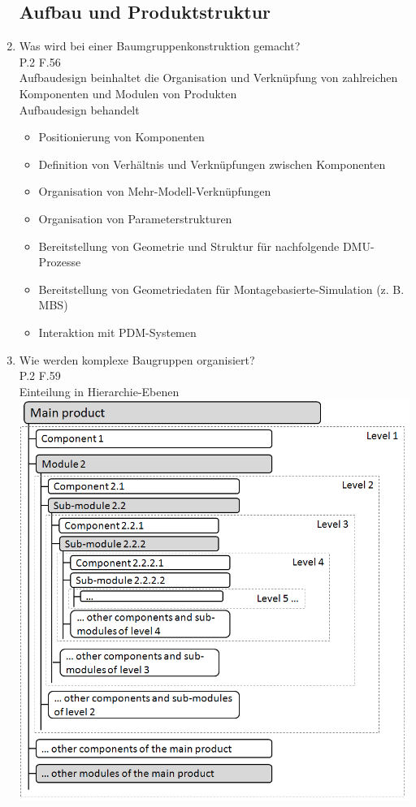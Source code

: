 \documentclass[10pt,a4paper,fleqn]{article}
\begin{document}
\begin{enumerate}
\subsection{Aufbau und Produktstruktur}
	\item Was wird bei einer Baumgruppenkonstruktion gemacht?\\
		P.2 F.56\\
		Aufbaudesign beinhaltet die Organisation und Verknüpfung von zahlreichen Komponenten und Modulen von Produkten\\
		Aufbaudesign behandelt \vspace{-0.3cm}
			\begin{itemize}
				\item Positionierung von Komponenten
				\item Definition von Verhältnis und Verknüpfungen zwischen Komponenten
				\item Organisation von Mehr-Modell-Verknüpfungen
				\item Organisation von Parameterstrukturen
				\item Bereitstellung von Geometrie und Struktur für nachfolgende DMU-Prozesse
				\item Bereitstellung von Geometriedaten für Montagebasierte-Simulation (z. B. MBS)
				\item Interaktion mit PDM-Systemen
			\end{itemize}
	\item Wie werden komplexe Baugruppen organisiert? \\
		P.2 F.59\\
		Einteilung in Hierarchie-Ebenen\\
		\includegraphics[scale=0.3]{hirarchie.png}

\end{enumerate}
\end{document}
